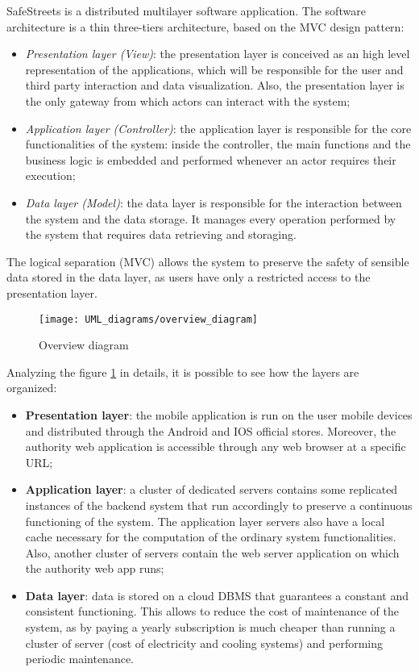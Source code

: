 SafeStreets is a distributed multilayer software application. The software architecture is a thin three-tiers architecture, based on the MVC design pattern:
\begin{itemize}
    \item \textit{Presentation layer (View)}: the presentation layer is conceived as an high level representation of the applications, which will be responsible for the user and third party interaction and data visualization. Also, the presentation layer is the only gateway from which actors can interact with the system;
    \item \textit{Application layer (Controller)}: the application layer is responsible for the core functionalities of the system: inside the controller, the main functions and the business logic is embedded and performed whenever an actor requires their execution;
    \item \textit{Data layer (Model)}: the data layer is responsible for the interaction between the system and the data storage. It manages every operation performed by the system that requires data retrieving and storaging.
\end{itemize}
The logical separation (MVC) allows the system to preserve the safety of sensible data stored in the data layer, as users have only a restricted access to the presentation layer.
\begin{figure}[H]
    \centering
    \texttt{[image: UML\_diagrams/overview\_diagram]}
    \caption{Overview diagram}
    \label{fig:overview_diagram}
\end{figure}
Analyzing the figure \ref{fig:overview_diagram} in details, it is possible to see how the layers are organized:
\begin{itemize}
    \item \textbf{Presentation layer}: the mobile application is run on the user mobile devices and distributed through the Android and IOS official stores. Moreover, the authority web application is accessible through any web browser at a specific URL;
    \item \textbf{Application layer}: a cluster of dedicated servers contains some replicated instances of the backend system that run accordingly to preserve a continuous functioning of the system. The application layer servers also have a local cache necessary for the computation of the ordinary system functionalities. Also, another cluster of servers contain the web server application on which the authority web app runs; 
    \item \textbf{Data layer}: data is stored on a cloud DBMS that guarantees a constant and consistent functioning. This allows to reduce the cost of maintenance of the system, as by paying a yearly subscription is much cheaper than running a cluster of server (cost of electricity and cooling systems) and performing periodic maintenance.
\end{itemize} 
